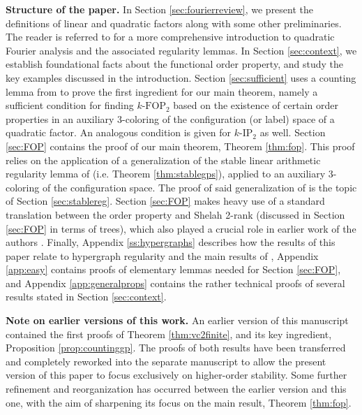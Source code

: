 \documentclass[12pt,oneside,british,a4wide]{amsart}
\numberwithin{equation}{section}
\theoremstyle{definition}
\def\FOP{\mathrm{FOP}}
\def\IP{\mathrm{IP}}
\begin{document}
\textbf{Structure of the paper.}
In Section \ref{sec:fourierreview}, we present the definitions of linear and quadratic factors along with some other preliminaries. The reader is referred to \cite{Terry.2021d} for a more comprehensive introduction to quadratic Fourier analysis and the associated regularity lemmas.  In Section \ref{sec:context}, we establish foundational facts about the functional order property, and study the key examples discussed in the introduction. Section \ref{sec:sufficient} uses a counting lemma from \cite{Terry.2021d} to prove the first ingredient for our main theorem, namely a sufficient condition for finding $k$-$\FOP_2$ based on the existence of certain order properties in an auxiliary $3$-coloring of the configuration (or label) space of a quadratic factor.  An analogous condition is given for $k$-$\IP_2$ as well.  Section \ref{sec:FOP} contains the proof of our main theorem, Theorem \ref{thm:fop}.  This proof relies on the application of a generalization of the stable linear arithmetic regularity lemma of \cite{Terry.2019} (i.e. Theorem \ref{thm:stablegps}), applied to an auxiliary $3$-coloring of the configuration space.  The proof of said generalization of \cite{Terry.2019} is the topic of Section \ref{sec:stablereg}. Section \ref{sec:FOP} makes heavy use of a standard translation between the order property and Shelah 2-rank (discussed in Section \ref{sec:FOP} in terms of trees), which also played a crucial role in earlier work of the authors \cite{Terry.2019, Terry.2020}.  Finally, Appendix \ref{ss:hypergraphs} describes how the results of this paper relate to hypergraph regularity and the main results of \cite{Terry.2021b}, Appendix \ref{app:easy} contains proofs of elementary lemmas needed for Section \ref{sec:FOP}, and Appendix \ref{app:generalprops} contains the rather technical proofs of several results stated in Section \ref{sec:context}.

\medskip

\textbf{Note on earlier versions of this work.} An earlier version of this manuscript \cite{Terry.2021av2} contained the first proofs of Theorem \ref{thm:vc2finite}, and its key ingredient, Proposition \ref{prop:countinggp}. The proofs of both results have been transferred and completely reworked into the separate manuscript \cite{Terry.2021d} to allow the present version of this paper to focus exclusively on higher-order stability. Some further refinement and reorganization has occurred between the earlier version \cite{Terry.2021av2} and this one, with the aim of sharpening its focus on the main result, Theorem \ref{thm:fop}.
\end{document}
